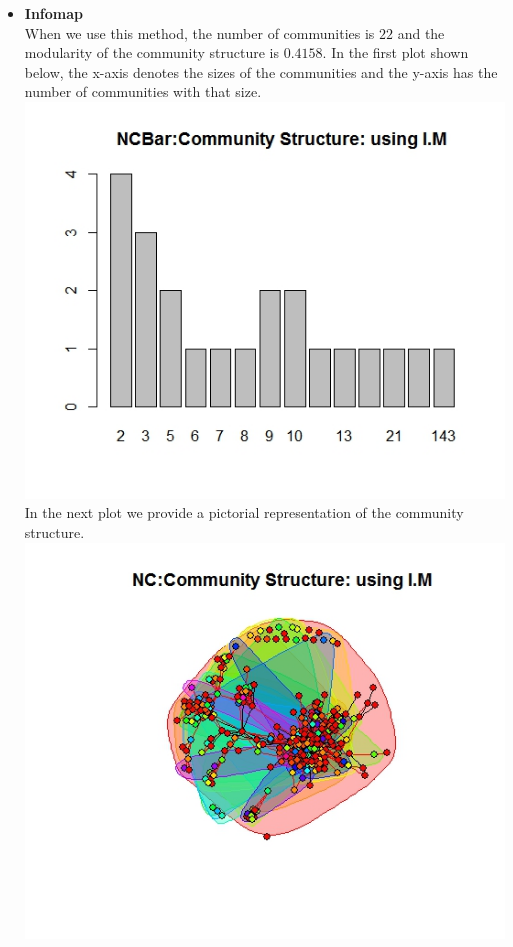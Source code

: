 \documentclass{article}
\begin{document}
\begin{itemize}
	\item \textbf{Infomap}\\
	When we use this method, the number of communities is $22$ and the modularity of the community
	structure is $0.4158$.
	In the first plot shown below, the x-axis denotes the sizes of the communities and the y-axis has the number of communities with that size.\\
	\includegraphics[scale=0.4]{q5f} \\
	In the next plot we provide a pictorial representation of the community structure.\\
	\includegraphics[scale=0.4]{q5g} \\ 
\end{itemize}
\end{document}
